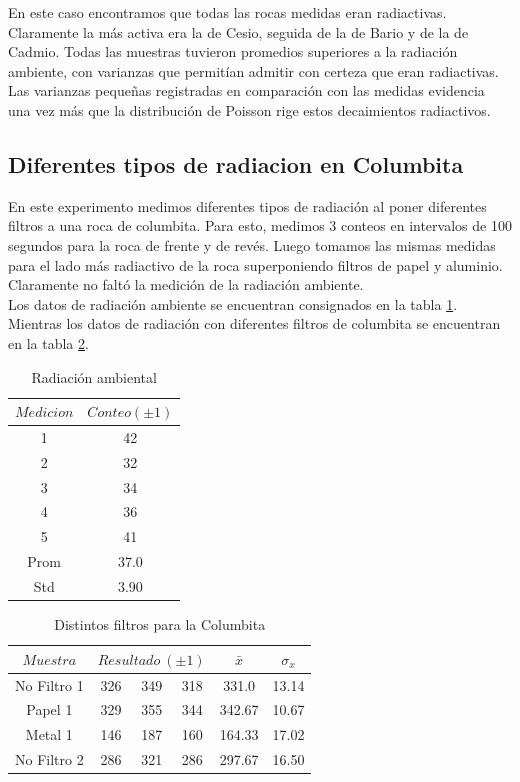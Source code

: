 \documentclass[%
 reprint,
 amsmath,amssymb,
 aps,
]{revtex4-1}
\begin{document}
En este caso encontramos que todas las rocas medidas eran radiactivas. Claramente la más activa era la de Cesio, seguida de la de Bario y de la de Cadmio. Todas las muestras tuvieron promedios superiores a la radiación ambiente, con varianzas que permitían admitir con certeza que eran radiactivas. Las varianzas pequeñas registradas en comparación con las medidas evidencia una vez más que la distribución de Poisson rige estos decaimientos radiactivos.\\

\subsection{\label{sec:level2}Diferentes tipos de radiacion en Columbita}
En este experimento medimos diferentes tipos de radiación al poner diferentes filtros a una roca de columbita. Para esto, medimos 3 conteos en intervalos de 100 segundos para la roca de frente y de revés. Luego tomamos las mismas medidas para el lado más radiactivo de la roca superponiendo filtros de papel y aluminio. Claramente no faltó la medición de la radiación ambiente.\\

Los datos de radiación ambiente se encuentran consignados en la tabla \ref{table:ambiente5}. Mientras los datos de radiación con diferentes filtros de columbita se encuentran en la tabla \ref{table:columbita}.\\


\begin{table}[h!]
\centering
\begin{tabular}{|c|c|}
	\hline $Medicion $ & $ Conteo (\pm 1) $ \\ 
	\hline\hline
	1&42\\
	2&32\\
	3&34\\
	4&36\\
	5&41\\
	Prom&37.0\\
	Std&3.90\\
	[1ex] 
 \hline
 \end{tabular} 
  \caption{Radiación ambiental}
\label{table:ambiente5} 
\end{table}


\begin{table}[h!]
\centering
\begin{tabular}{|c|c|c|c|c|c|}
	\hline $ Muestra $ & \multicolumn{3}{c|}{$Resultado\ (\pm 1)$ } & $\bar{x}$& $\sigma_x$ \\ 
	\hline\hline
	No Filtro 1 &326&349&318&331.0&13.14\\
	Papel 1&329&355&344&342.67&10.67\\
	Metal 1&146&187&160&164.33&17.02\\
	No Filtro 2 &286&321&286&297.67&16.50\\
	[1ex] 
 \hline
 \end{tabular} 
  \caption{Distintos filtros para la Columbita}
\label{table:columbita} 
\end{table}
\end{document}

